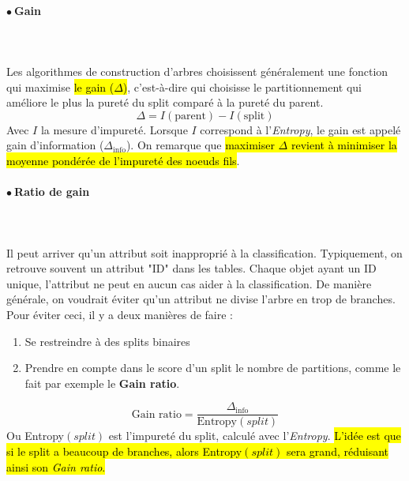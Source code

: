 \documentclass[letterpaper, 12pt]{article}
\newcommand{\alinea}{
\hspace*{0.5cm}}
\newcommand{\point}{$\bullet\ $}
\begin{document}
			\paragraph{\point Gain}~\\~\\
			\alinea Les algorithmes de construction d'arbres choisissent 
				généralement une fonction qui maximise \hl{le gain ($\Delta$)}, 
				c'est-à-dire qui choisisse le partitionnement qui
				améliore le plus la pureté du split comparé à la pureté
				du parent.
				$$ \Delta = I(\text{parent}) - I(\text{split}) $$
			Avec $I$ la mesure d'impureté. Lorsque $I$ 
			correspond à l'\textit{Entropy}, le gain est appelé gain 
			d'information ($\Delta_{\text{info}}$). On remarque que
			\hl{maximiser $\Delta$ revient à minimiser la moyenne pondérée de 
			l'impureté des noeuds fils}.
			\newpage
			\paragraph{\point Ratio de gain}~\\~\\
			\alinea Il peut arriver qu'un attribut soit inapproprié à
				la classification. Typiquement, on retrouve souvent un 
				attribut "ID" dans les tables. Chaque objet ayant un
				ID unique, l'attribut ne peut en aucun cas aider à la
				classification. De manière générale, on voudrait éviter
				qu'un attribut ne divise l'arbre en trop de branches.\\
			\alinea Pour éviter ceci, il y a deux manières de faire :
			\begin{enumerate}
				\item Se restreindre à des splits binaires
				\item Prendre en compte dans le score d'un split le nombre 
					de partitions, comme le fait par exemple le 
					\textbf{Gain ratio}.
			\end{enumerate}
			$$ \text{Gain ratio} = \frac{\Delta_{\text{info}}}%
				{\text{Entropy}(split)}$$
			Ou Entropy$(split)$ est l'impureté du split, calculé avec
				l'\textit{Entropy}. \hl{L'idée est que si le split a 
				beaucoup de branches, alors Entropy$(split)$ sera grand,
				réduisant ainsi son \textit{Gain ratio}.}
\end{document}
